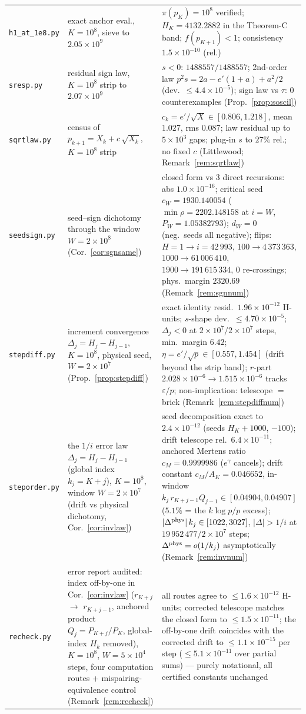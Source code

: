\documentclass[11pt]{article}
\theoremstyle{remark}
\newcommand{\eps}{\varepsilon}
\newcommand{\gam}{\gamma}
\begin{document}
\begin{center}
\begin{tabular}{@{}lll@{}}
\texttt{h1\_at\_1e8.py} & exact anchor eval., $K=10^8$, sieve to $2.05\times10^9$ & $\pi(p_K)=10^8$ verified; $H_K=4132.2882$ in the Theorem-C band; $f(p_{K+1})<1$; consistency $1.5\times10^{-10}$ (rel.) \\
\texttt{sresp.py} & residual sign law, $K=10^8$ strip to $2.07\times10^9$ & $s<0$: $1488557/1488557$; 2nd-order law $p^2s=2a-e'(1+a)+a^2/2$ (dev.\ $\le4.4\times10^{-5}$); sign law vs $\tau$: 0 counterexamples (Prop.~\ref{prop:soscil}) \\
\texttt{sqrtlaw.py} & census of $p_{k+1}=X_k+c\,\sqrt{X_k}$, $K=10^8$ strip & $c_k=e'/\sqrt{X}\in[0.806,1.218]$, mean $1.027$, rms $0.087$; law residual up to $5\times10^3$ gaps; plug-in $s$ to $27\%$ rel.; no fixed $c$ (Littlewood; Remark~\ref{rem:sqrtlaw}) \\
\texttt{seedsign.py} & seed--sign dichotomy through the window $W=2\times10^8$ (Cor.~\ref{cor:sgnsame}) & closed form vs 3 direct recursions: abs $1.0\times10^{-16}$; critical seed $c_W=1930.140054$ ($\min\rho=2202.148158$ at $i=W$, $P_W=1.05382793$); $d_W=0$ (neg.\ seeds all negative); flips: $H=1\to i=42\,993$, $100\to4\,373\,363$, $1000\to61\,006\,410$, $1900\to191\,615\,334$, 0 re-crossings; phys.\ margin $2320.69$ (Remark~\ref{rem:sgnnum}) \\
\texttt{stepdiff.py} & increment convergence $\Delta_j=H_j-H_{j-1}$, $K=10^8$, physical seed, $W=2\times10^7$ (Prop.~\ref{prop:stepdiff}) & exact identity resid.\ $1.96\times10^{-12}$ H-units; $s$-shape dev.\ $\le4.70\times10^{-5}$; $\Delta_j<0$ at $2\times10^7/2\times10^7$ steps, min.\ margin $6.42$; $\eta=e'/\sqrt p\in[0.557,1.454]$ (drift beyond the strip band); $r$-part $2.028\times10^{-6}\to1.515\times10^{-6}$ tracks $\eps/p$; non-implication: telescope $=$ brick (Remark~\ref{rem:stepdiffnum}) \\
\texttt{steporder.py} & the $1/i$ error law $\Delta_j=H_j-H_{j-1}$ (global index $k_j=K+j$), $K=10^8$, window $W=2\times10^7$ (drift vs physical dichotomy, Cor.~\ref{cor:invlaw}) & seed decomposition exact to $2.4\times10^{-12}$ (seeds $H_K{+}1000$, $-100$); drift telescope rel.\ $6.4\times10^{-11}$; anchored Mertens ratio $c_M=0.9999986$ ($e^{\gam}$ cancels); drift constant $c_M/A_K=0.046652$, in-window $k_j\,r_{K+j-1}Q_{j-1}\in[0.04904,0.04907]$ ($5.1\%$ = the $k\log p/p$ excess); $|\Delta^{\rm phys}|\,k_j\in[1022,3027]$, $|\Delta|>1/i$ at $19\,952\,477/2\times10^7$ steps; $\Delta^{\rm phys}=o(1/k_j)$ asymptotically (Remark~\ref{rem:invnum}) \\
\texttt{recheck.py} & error report audited: index off-by-one in Cor.~\ref{cor:invlaw} ($r_{K+j}$ $\to$ $r_{K+j-1}$, anchored product $Q_j=P_{K+j}/P_K$, global-index $H_k$ removed), $K=10^8$, $W=5\times10^4$ steps, four computation routes + mispairing-equivalence control (Remark~\ref{rem:recheck}) & all routes agree to $\le1.6\times10^{-12}$ H-units; corrected telescope matches the closed form to $\le1.5\times10^{-11}$; the off-by-one drift coincides with the corrected drift to $\le1.1\times10^{-15}$ per step ($\le5.1\times10^{-11}$ over partial sums) --- purely notational, all certified constants unchanged \\

\end{tabular}
\end{center}
\end{document}
